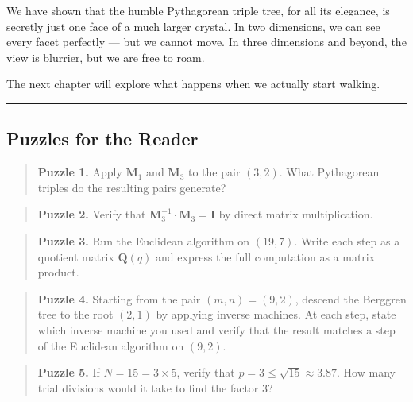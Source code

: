 \documentclass[12pt, letterpaper, openany]{book}
\theoremstyle{definition}
\theoremstyle{remark}
\begin{document}
We have shown that the humble Pythagorean triple tree, for all its elegance, is secretly just one face of a much larger crystal. In two dimensions, we can see every facet perfectly --- but we cannot move. In three dimensions and beyond, the view is blurrier, but we are free to roam.

The next chapter will explore what happens when we actually start walking.


\bigskip\noindent\rule{\textwidth}{0.4pt}\bigskip



\subsection*{Puzzles for the Reader}



\begin{quote}
\textbf{Puzzle 1.} Apply $\mathbf{M}_1$ and $\mathbf{M}_3$ to the pair $(3, 2)$. What Pythagorean triples do the resulting pairs generate?
\end{quote}



\begin{quote}
\textbf{Puzzle 2.} Verify that $\mathbf{M}_3^{-1} \cdot \mathbf{M}_3 = \mathbf{I}$ by direct matrix multiplication.
\end{quote}



\begin{quote}
\textbf{Puzzle 3.} Run the Euclidean algorithm on $(19, 7)$. Write each step as a quotient matrix $\mathbf{Q}(q)$ and express the full computation as a matrix product.
\end{quote}



\begin{quote}
\textbf{Puzzle 4.} Starting from the pair $(m, n) = (9, 2)$, descend the Berggren tree to the root $(2, 1)$ by applying inverse machines. At each step, state which inverse machine you used and verify that the result matches a step of the Euclidean algorithm on $(9, 2)$.
\end{quote}



\begin{quote}
\textbf{Puzzle 5.} If $N = 15 = 3 \times 5$, verify that $p = 3 \le \sqrt{15} \approx 3.87$. How many trial divisions would it take to find the factor $3$?
\end{quote}
\end{document}
